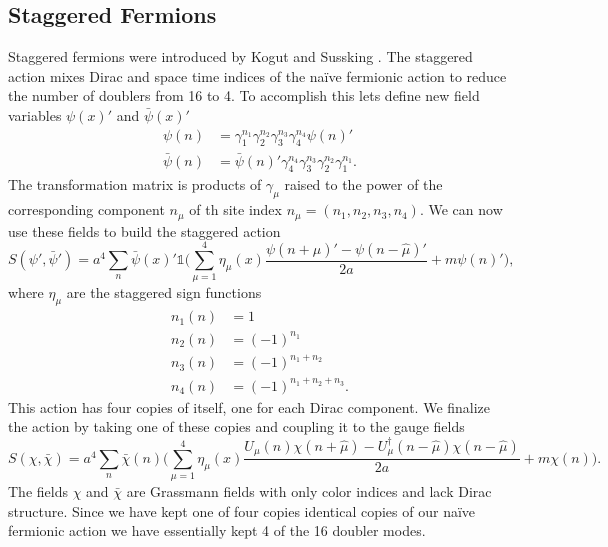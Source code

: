 \subsection{Staggered Fermions}

Staggered fermions were introduced by Kogut and Sussking \cite{ac69}.
The staggered action mixes Dirac and space time indices of the naïve fermionic action to reduce the number of doublers from 16 to 4.
To accomplish this lets define new field variables $\psi(x)'$ and $\bar{\psi}(x)'$
\begin{equation}
  \begin{aligned}
    \psi(n)&=\gamma_1^{n_1}\gamma_2^{n_2}\gamma_3^{n_3}\gamma_4^{n_4}\psi(n)'\\
    \bar{\psi}(n)&=\bar{\psi}(n)'\gamma_4^{n_4}\gamma_3^{n_3}\gamma_2^{n_2}\gamma_1^{n_1}.
  \end{aligned}
\end{equation}
The transformation matrix is products of $\gamma_\mu$ raised to the power of the corresponding component $n_\mu$ of th site index $n_\mu=(n_1,n_2,n_3,n_4)$.
We can now use these fields to build the staggered action
\begin{equation}
  S(\psi',\bar{\psi}')=a^4\sum_n \bar{\psi}(x)'\mathbb{1}\Big(\sum_{\mu=1}^4\eta_\mu(x)\frac{\psi(n+\hat{\mu})'-\psi(n-\hat{\mu})'}{2a}+m\psi(n)'\Big),
\end{equation}
where $\eta_\mu$ are the staggered sign functions
\begin{equation}
  \begin{aligned}
    n_1(n)&=1 \\
    n_2(n)&=(-1)^{n_1} \\
    n_3(n)&=(-1)^{n_1+n_2} \\
    n_4(n)&=(-1)^{n_1+n_2+n_3}.
  \end{aligned}
\end{equation}
This action has four copies of itself, one for each Dirac component.
We finalize the action by taking one of these copies and coupling it to the gauge fields
\begin{equation}
  S(\chi,\bar{\chi})=a^4\sum_n \bar{\chi}(n)\Big(\sum_{\mu=1}^4\eta_\mu(x)\frac{U_\mu(n)\chi(n+\hat{\mu})-U_\mu^\dagger(n-\hat{\mu})\chi(n-\hat{\mu})}{2a}+m\chi(n)\Big).
\end{equation}
The fields $\chi$ and $\bar{\chi}$ are Grassmann fields with only color indices and lack Dirac structure.
Since we have kept one of four copies identical copies of our naïve fermionic action we have essentially kept 4 of the 16 doubler modes.
